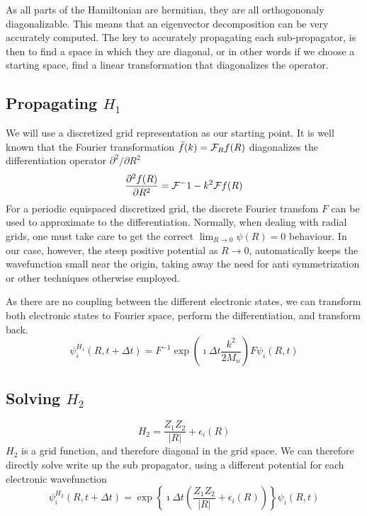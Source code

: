 \documentclass[a4paper]{article}
\begin{document}
As all parts of the Hamiltonian are hermitian, they are all orthogononaly diagonalizable. This means that an eigenvector decomposition can be very accurately computed.  The key to accurately propagating each sub-propagator, is then to find a space in which they are diagonal, or in other words if we choose a starting space, find a linear transformation that diagonalizes the operator.

\subsection{Propagating $H_1$}
We will use a discretized grid representation as our starting point. It is well known that the Fourier transformation $\bar{f}(k) = {\cal F}_R f(R)$ diagonalizes the differentiation operator $\partial^2/\partial R^2$
\begin{equation}
	\frac{\partial^2 f(R)}{\partial R^2} = {\cal F}^-1 -k^2 {\cal F} f(R)
\end{equation}
For a periodic equispaced discretized grid, the discrete Fourier transfom $F$ can be used to approximate to the differentiation. Normally, when dealing with radial grids, one must take care to get the correct $\lim_{R \rightarrow 0} \psi(R) = 0$ behaviour. In our case, however, the steep positive potential as $R \rightarrow 0$, automatically keeps the wavefunction small near the origin, taking away the need for anti symmetrization or other techniques otherwise employed.

As there are no coupling between the different electronic states, we can transform both electronic states to Fourier space, perform the differentiation, and transform back.
\begin{equation}
 	\psi_i^{H_1}(R, t+\Delta t) = F^{-1} \exp \left( \imath \Delta t \frac{k^2}{2 M_n} \right) F \psi_i(R, t)
\end{equation}

\subsection{Solving $H_2$}
\begin{equation}
	H_2 = \frac{Z_1 Z_2}{|R|} + \epsilon_i(R) 
\end{equation}
$H_2$ is a grid function, and therefore diagonal in the grid space. We can therefore directly solve write up the sub propagator, using a different potential 
for each electronic wavefunction
\begin{equation}
 	\psi_i^{H_2}(R, t+\Delta t) = \exp \left\{ \imath \Delta t \left(\frac{Z_1 Z_2}{|R|} + \epsilon_i(R) \right)  \right\} \psi_i(R, t)
\end{equation}
\end{document}
